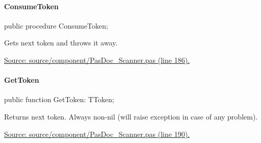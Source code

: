 \documentclass{report}
\newif\ifpdf
\begin{document}
\paragraph*{ConsumeToken}\hspace*{\fill}

\label{PasDoc_Scanner.TScanner-ConsumeToken}
\begin{list}{}{
\setlength{\itemindent}{0cm}
\setlength{\listparindent}{0cm}
\setlength{\leftmargin}{\evensidemargin}
\addtolength{\leftmargin}{\tmplength}
\settowidth{\labelsep}{X}
\addtolength{\leftmargin}{\labelsep}
\setlength{\labelwidth}{\tmplength}
}
\item[\textbf{Declaration}\hfill]
\ifpdf
\begin{flushleft}
\fi
\begin{ttfamily}
public procedure ConsumeToken;\end{ttfamily}

\ifpdf
\end{flushleft}
\fi

\par
\item[\textbf{Description}]
Gets next token and throws it away.\par
\href{https://github.com/pasdoc/pasdoc/blob/master/source/component/PasDoc_Scanner.pas#L186}{Source: source/component/PasDoc{\_}Scanner.pas (line 186).}

\end{list}
\paragraph*{GetToken}\hspace*{\fill}

\label{PasDoc_Scanner.TScanner-GetToken}
\begin{list}{}{
\setlength{\itemindent}{0cm}
\setlength{\listparindent}{0cm}
\setlength{\leftmargin}{\evensidemargin}
\addtolength{\leftmargin}{\tmplength}
\settowidth{\labelsep}{X}
\addtolength{\leftmargin}{\labelsep}
\setlength{\labelwidth}{\tmplength}
}
\item[\textbf{Declaration}\hfill]
\ifpdf
\begin{flushleft}
\fi
\begin{ttfamily}
public function GetToken: TToken;\end{ttfamily}

\ifpdf
\end{flushleft}
\fi

\par
\item[\textbf{Description}]
Returns next token. Always non{-}nil (will raise exception in case of any problem).\par
\href{https://github.com/pasdoc/pasdoc/blob/master/source/component/PasDoc_Scanner.pas#L190}{Source: source/component/PasDoc{\_}Scanner.pas (line 190).}

\end{list}
\end{document}
